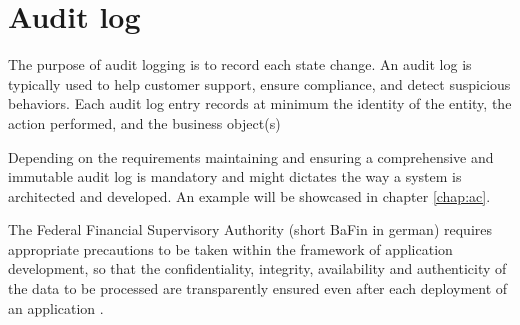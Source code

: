 

\section{Audit log} 

The purpose of audit logging is to record each state change. An audit log is typically used to help customer support, ensure compliance, and detect suspicious behaviors. Each audit log entry records at minimum the identity of the entity, the action performed, and the business object(s)~\citep{richardson2018microservices}


Depending on the requirements maintaining and ensuring a comprehensive and immutable audit log is mandatory and might dictates the way a system is architected and developed. An example will be showcased in chapter \ref{chap:ac}.

The Federal Financial Supervisory Authority (short BaFin in german) requires appropriate precautions to be taken within the framework of application development, so that the confidentiality, integrity, availability and authenticity of the data to be processed are transparently ensured even after each deployment of an application \citep{BaFinZAIT}. 



